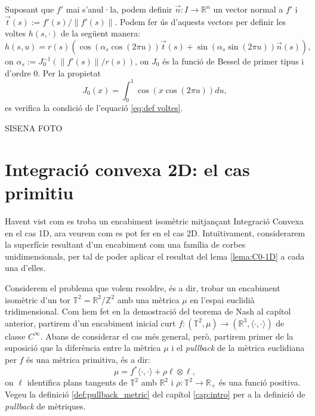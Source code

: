 Suposant que $f'$ mai s'anul·la, podem definir $\vec n:I\to\mathbb R^n$ un vector normal a $f'$ i $\vec t(s):=f'(s)/\|f'(s)\|$. Podem fer ús d'aquests vectors per definir les voltes $h(s, \cdot)$ de la següent manera:
\begin{equation*}
    h(s, u) = r(s)(\cos(\alpha_s\cos(2\pi u))\vec t(s) + \sin(\alpha_s\sin(2\pi u))\vec n(s)),
\end{equation*}
on $\alpha_s := J_0^{-1}(\|f'(s)\|/r(s))$, on $J_0$ és la funció de Bessel de primer tipus i d'ordre 0. Per la propietat
\begin{equation*}
    J_0(x) = \int_0^1 \cos(x\cos(2\pi u)) du,
\end{equation*}
es verifica la condició de l'equació \eqref{eq:def voltes}.

{\color{blue} SISENA FOTO}

\section{Integració convexa 2D: el cas primitiu}
Havent vist com es troba un encabiment isomètric mitjançant Integració Convexa en el cas 1D, ara veurem com es pot fer en el cas 2D. Intuïtivament, considerarem la superfície resultant d'un encabiment com una família de corbes unidimensionals, per tal de poder aplicar el resultat del lema \ref{lema:C0-1D} a cada una d'elles.

Considerem el problema que volem resoldre, és a dir, trobar un encabiment isomètric d'un tor $\mathbb T^2 = \mathbb R^2/\mathbb Z^2$ amb una mètrica $\mu$ en l'espai euclidià tridimensional. Com hem fet en la demostració del teorema de Nash al capítol anterior, partirem d'un encabiment inicial curt $f:(\mathbb T^2, \mu)\to(\mathbb R^3, \langle\cdot, \cdot\rangle)$ de classe $C^\infty$. Abans de considerar el cas més general, però, partirem primer de la suposició que la diferència entre la mètrica $\mu$ i el \textit{pullback} de la mètrica euclidiana per $f$ és una mètrica primitiva, és a dir:
\begin{equation}\label{eq:def primitiva}
    \mu = f^*\langle\cdot, \cdot\rangle + \rho \ell\otimes \ell,
\end{equation}
on $\ell$ identifica plans tangents de $\mathbb T^2$ amb $\mathbb R^2$ i $\rho:\mathbb T^2\to\mathbb R_+$ és una funció positiva. Vegeu la definició \ref{def:pullback_metric} del capítol \ref{cap:intro} per a la definició de \textit{pullback} de mètriques.

